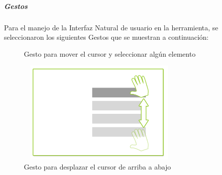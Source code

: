 \subparagraph{Gestos}

Para el manejo de la Interfaz Natural de usuario en la herramienta, se seleccionaron los siguientes Gestos que se muestran a continuación:\\

\begin{figure}[H]
	\centering
	\caption{Gesto para mover el cursor y seleccionar algún elemento}
	\label{fig:Gesto_Seleccionar}
\end{figure}

\begin{figure}[H]
	\begin{center}
		\includegraphics[width=8cm, height=5cm]{./Figuras/Gestos/Gesto-Subir-Bajar}
	\end{center}
	\caption{Gesto para desplazar el cursor de arriba a abajo}
	\label{fig:Gesto_Subir}
\end{figure}

\clearpage